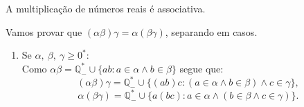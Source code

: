 \documentclass[../main.tex]{subfiles}
\begin{document}
\begin{prop}\label{reais-prop-produtoAssociativo}
    A multiplicação de números reais é associativa.
\end{prop}
\begin{dem}
    Vamos provar que $(\alpha\beta)\gamma = \alpha(\beta\gamma)$, separando em casos. 
    \begin{enumerate}
        \item Se $\alpha,\ \beta,\ \gamma \geq 0^*$: \\
            Como $\alpha\beta = \mathbb{Q}_{-}^* \cup \{ ab : a \in \alpha \land b \in \beta \}$ segue que: 
            \[ (\alpha\beta)\gamma = \mathbb{Q}_{-}^* \cup \{ (ab)c : (a \in \alpha \land b \in \beta) \land c \in \gamma \}, \]
            \[ \alpha(\beta\gamma) = \mathbb{Q}_{-}^* \cup \{ a(bc) : a \in \alpha \land (b \in \beta \land c \in \gamma) \}. \]
    

\end{enumerate}
\end{dem}
\end{document}
